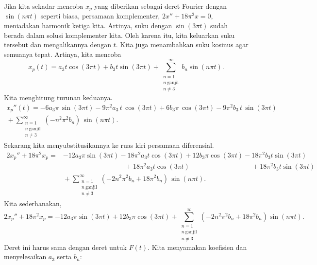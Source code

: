 \begin{example}
Jika kita sekadar mencoba $x_p$ yang diberikan sebagai deret Fourier dengan $\sin (n\pi t)$ seperti biasa,
persamaan komplementer, $2x''+18\pi^2x=0$, meniadakan harmonik ketiga kita.  Artinya, suku
dengan $\sin(3 \pi t)$
sudah
berada dalam solusi komplementer kita.
Oleh karena itu, kita keluarkan suku tersebut dan
mengalikannya dengan $t$.  Kita juga menambahkan suku kosinus agar semuanya tepat.
Artinya, kita mencoba
\begin{equation*}
x_p(t) =
a_3
t \cos (3 \pi t )
+
b_3
t \sin (3 \pi t)
+
\sum_{\substack{n=1 \\ n~\text{ganjil} \\ n \neq 3}}^\infty
b_n
\sin (n \pi t) . 
\end{equation*}
Kita menghitung turunan keduanya.
\begin{multline*}
x_p''(t) =
- 6 a_3
\pi \, \sin (3 \pi t) - 9\pi^2 a_3 \, t \, \cos (3 \pi t)
+
6 b_3
\pi \, \cos (3 \pi t) - 9\pi^2 b_3 \, t \, \sin (3 \pi t)
\\
{} +
\sum_{\substack{n=1 \\ n~\text{ganjil} \\ n \neq 3}}^\infty
(-n^2 \pi^2 b_n ) \,
\sin (n \pi t) . 
\end{multline*}
Sekarang kita menyubstitusikannya ke ruas kiri persamaan diferensial.
\begin{align*}
2x_p'' + 18\pi^2 x_p 
= & 
- 12 a_3 \pi \sin (3 \pi t)
- 18\pi^2 a_3 t \cos (3 \pi t)
+ 12 b_3 \pi \cos (3 \pi t)
- 18\pi^2 b_3 t \sin (3 \pi t)
\\
& \phantom{\, - 12 a_3 \pi \sin (3 \pi t)} ~
{} + 18 \pi^2 a_3 t \cos (3 \pi t)
\phantom{\, + 12 b_3 \pi \cos (3 \pi t)} ~
{} + 18 \pi^2 b_3 t \sin (3 \pi t)
\\
& {} + \sum_{\substack{n=1 \\ n~\text{ganjil} \\ n \neq 3}}^\infty
(-2n^2 \pi^2 b_n + 18\pi^2 b_n) \,
\sin (n \pi t) . 
\end{align*}
Kita sederhanakan,
\begin{equation*}
2x_p'' + 18\pi^2 x_p =
- 12 a_3
\pi \sin (3 \pi t)
+
12 b_3
\pi \cos (3 \pi t)
+
\sum_{\substack{n=1 \\ n~\text{ganjil} \\ n \neq 3}}^\infty
(-2n^2 \pi^2 b_n + 18\pi^2 b_n)
\sin (n \pi t) . 
\end{equation*}
Deret ini harus sama dengan deret untuk $F(t)$.
Kita menyamakan koefisien dan menyelesaikan $a_3$ serta $b_n$:
\begin{align*}

\end{align*}
\end{example}
